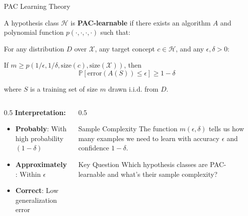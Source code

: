 \documentclass[aspectratio=169,11pt]{beamer}
\newcommand{\Prob}{\mathbb{P}}
\begin{document}
\begin{frame}{PAC Learning Theory}
\begin{definition}
A hypothesis class $\mathcal{H}$ is \textbf{PAC-learnable} if there exists an algorithm $A$ and polynomial function $p(\cdot, \cdot, \cdot, \cdot)$ such that:

For any distribution $D$ over $\mathcal{X}$, any target concept $c \in \mathcal{H}$, and any $\epsilon, \delta > 0$:

If $m \geq p(1/\epsilon, 1/\delta, \text{size}(c), \text{size}(\mathcal{X}))$, then
\[\Prob[\text{error}(A(S)) \leq \epsilon] \geq 1 - \delta\]

where $S$ is a training set of size $m$ drawn i.i.d. from $D$.
\end{definition}

\begin{columns}
\begin{column}{0.5\textwidth}
\textbf{Interpretation:}
\begin{itemize}
\item \textcolor{forest}{\textbf{Probably}}: With high probability $(1-\delta)$
\item \textcolor{forest}{\textbf{Approximately}}: Within $\epsilon$
\item \textcolor{forest}{\textbf{Correct}}: Low generalization error
\end{itemize}
\end{column}
\begin{column}[t]{0.5\textwidth}
\begin{block}{Sample Complexity}
The function $m(\epsilon, \delta)$ tells us how many examples we need to learn with accuracy $\epsilon$ and confidence $1-\delta$.
\end{block}

\begin{alertblock}{Key Question}
Which hypothesis classes are PAC-learnable and what's their sample complexity?
\end{alertblock}
\end{column}
\end{columns}
\end{frame}
\end{document}
